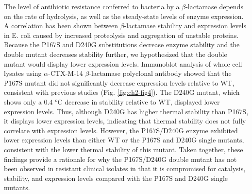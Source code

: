 \documentclass[../main.tex]{subfiles}
\begin{document}
        The level of antibiotic resistance conferred to bacteria by a $\beta$-lactamase depends on the rate of hydrolysis, as well as the steady-state levels of enzyme expression\cite{huang_natural_1997}. A correlation has been shown between $\beta$-lactamase stability and expression levels in E. coli caused by increased proteolysis and aggregation of unstable proteins\cite{huang_natural_1997,brown_multiple_2010,mayer_correlation_2007}. Because the P167S and D240G substitutions decrease enzyme stability and the double mutant decreases stability further, we hypothesized that the double mutant would display lower expression levels. Immunoblot analysis of whole cell lysates using $\alpha$-CTX-M-14 $\beta$-lactamase polyclonal antibody showed that the P167S mutant did not significantly decrease expression levels relative to WT, consistent with previous studies (Fig. \ref{fig:ch2-fig4})\cite{patel_characterization_2015}. The D240G mutant, which shows only a 0.4 °C decrease in stability relative to WT, displayed lower expression levels. Thus, although D240G has higher thermal stability than P167S, it displays lower expression levels, indicating that thermal stability does not fully correlate with expression levels. However, the P167S/D240G enzyme exhibited lower expression levels than either WT or the P167S and D240G single mutants, consistent with the lower thermal stability of this mutant. Taken together, these findings provide a rationale for why the P167S/D240G double mutant has not been observed in resistant clinical isolates in that it is compromised for catalysis, stability, and expression levels compared with the P167S and D240G single mutants.
\end{document}
